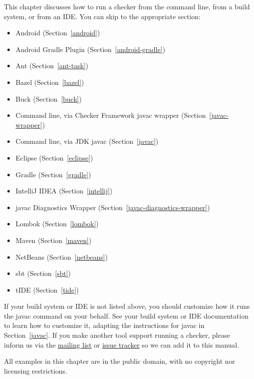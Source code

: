 \htmlhr
{}

This chapter discusses how to run a checker from the command line, from a
build system, or from an IDE\@.  You can skip to the appropriate section:

\begin{itemize}
\item Android (Section~\ref{android})
\item Android Gradle Plugin (Section~\ref{android-gradle})
\item Ant (Section~\ref{ant-task})
\item Bazel (Section~\ref{bazel})
\item Buck (Section~\ref{buck})
\item Command line, via Checker Framework javac wrapper (Section~\ref{javac-wrapper})
\item Command line, via JDK javac (Section~\ref{javac})
\item Eclipse (Section~\ref{eclipse})
\item Gradle (Section~\ref{gradle})
\item IntelliJ IDEA (Section~\ref{intellij})
\item javac Diagnostics Wrapper (Section~\ref{javac-diagnostics-wrapper})
\item Lombok (Section~\ref{lombok})
\item Maven (Section~\ref{maven})
\item NetBeans (Section~\ref{netbeans})
\item sbt (Section~\ref{sbt})
\item tIDE (Section~\ref{tide})
\end{itemize}

If your build system or IDE is not listed above, you should customize how
it runs the javac command on your behalf.  See your build system or IDE
documentation to learn how to
customize it, adapting the instructions for javac in Section~\ref{javac}.
If you make another tool support running a checker, please
inform us via the
\href{https://groups.google.com/forum/#!forum/checker-framework-discuss}{mailing
  list} or
\href{https://github.com/typetools/checker-framework/issues}{issue tracker} so
we can add it to this manual.

All examples in this chapter are in the public domain, with no copyright nor
licensing restrictions.


